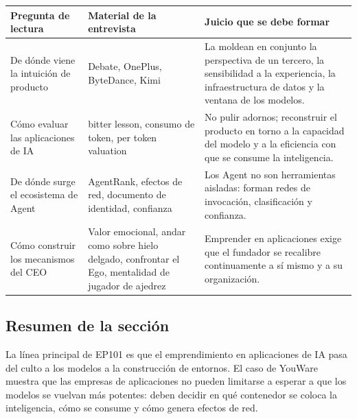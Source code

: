 \noindent\begin{tabularx}{\textwidth}{p{}p{}X}
\toprule
Pregunta de lectura & Material de la entrevista & Juicio que se debe formar \\
\midrule
De dónde viene la intuición de producto & Debate, OnePlus, ByteDance, Kimi & La moldean en conjunto la perspectiva de un tercero, la sensibilidad a la experiencia, la infraestructura de datos y la ventana de los modelos. \\
Cómo evaluar las aplicaciones de IA & bitter lesson, consumo de token, per token valuation & No pulir adornos; reconstruir el producto en torno a la capacidad del modelo y a la eficiencia con que se consume la inteligencia. \\
De dónde surge el ecosistema de Agent & AgentRank, efectos de red, documento de identidad, confianza & Los Agent no son herramientas aisladas: forman redes de invocación, clasificación y confianza. \\
Cómo construir los mecanismos del CEO & Valor emocional, andar como sobre hielo delgado, confrontar el Ego, mentalidad de jugador de ajedrez & Emprender en aplicaciones exige que el fundador se recalibre continuamente a sí mismo y a su organización. \\
\bottomrule
\end{tabularx}

\subsection{Resumen de la sección}

La línea principal de EP101 es que el emprendimiento en aplicaciones de IA pasa del culto a los modelos a la construcción de entornos. El caso de YouWare muestra que las empresas de aplicaciones no pueden limitarse a esperar a que los modelos se vuelvan más potentes: deben decidir en qué contenedor se coloca la inteligencia, cómo se consume y cómo genera efectos de red.
